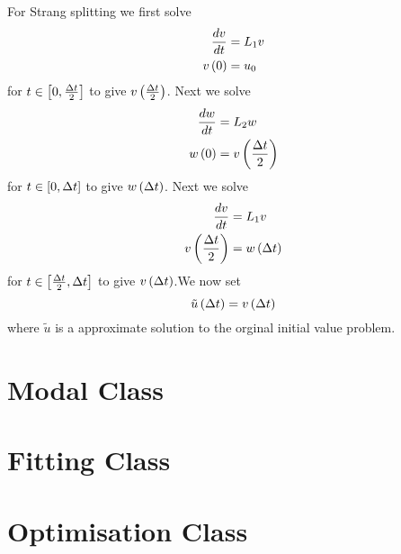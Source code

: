 For Strang splitting we first solve
\begin{align}
   \dfrac{ d v}{d t} &=L_{1}v \\
   v\left( 0 \right) &=u_{0}
\end{align}
for $t\in\left[ 0,\frac{\Delta t}{2} \right]$ to give $ v\left( \frac{\Delta t}{2} \right) $. Next we solve
\begin{align}
   \dfrac{ d w}{d t} &=L_{2}w \\
   w\left( 0 \right) &= v\left( \frac{\Delta t}{2} \right) 
\end{align}
for $t\in\left[ 0,\Delta t \right]$ to give $ w\left( \Delta t \right) $. Next we solve
\begin{align}
   \dfrac{ d v}{d t} &=L_{1}v \\
   v\left( \frac{\Delta t}{2} \right) &= w\left( \Delta t \right) 
\end{align}
for $t\in\left[ \frac{\Delta t}{2},\Delta t \right]$ to give $ v\left( \Delta t \right) $.We now set
\begin{equation}
 \tilde{u}\left( \Delta t \right) = v\left( \Delta t \right) 
\end{equation}
where $\tilde{u}$ is a approximate solution to the orginal initial value
problem.

\section{Modal Class}

\section{Fitting Class}

\section{Optimisation Class}
